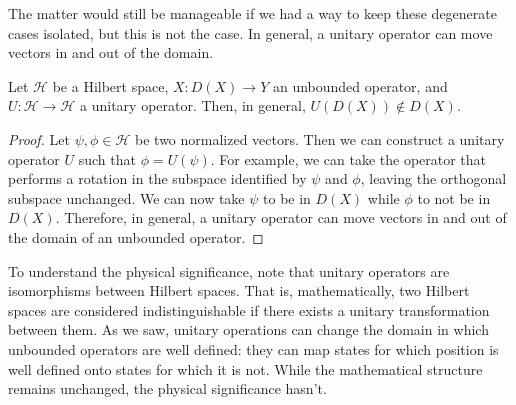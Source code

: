 \documentclass[10pt,twocolumn, nofootinbib]{revtex4-2}
\begin{document}
The matter would still be manageable if we had a way to keep these degenerate cases isolated, but this is not the case. In general, a unitary operator can move vectors in and out of the domain.
\begin{prop}
Let $\mathcal{H}$ be a Hilbert space, $X : D(X) \to Y$ an unbounded operator, and $U : \mathcal{H} \to \mathcal{H}$ a unitary operator. Then, in general, $U(D(X)) \notin D(X)$.
\end{prop}
\begin{proof}
Let $\psi, \phi \in \mathcal{H}$ be two normalized vectors. Then we can construct a unitary operator $U$ such that $\phi = U(\psi)$. For example, we can take the operator that performs a rotation in the subspace identified by $\psi$ and $\phi$, leaving the orthogonal subspace unchanged. We can now take $\psi$ to be in $D(X)$ while $\phi$ to not be in $D(X)$. Therefore, in general, a unitary operator can move vectors in and out of the domain of an unbounded operator.
\end{proof}

To understand the physical significance, note that unitary operators are isomorphisms between Hilbert spaces. That is, mathematically, two Hilbert spaces are considered indistinguishable if there exists a unitary transformation between them. As we saw, unitary operations can change the domain in which unbounded operators are well defined: they can map states for which position is well defined onto states for which it is not. While the mathematical structure remains unchanged, the physical significance hasn't.
\end{document}
